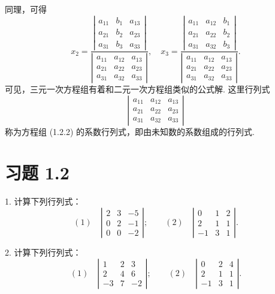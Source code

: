 \documentclass[UTF8, 12pt, fontset=fandol, oneside]{ctexart}
\begin{document}
同理，可得
\[
x_2=
\frac{
\left|\begin{array}{ccc}
a_{11} & b_1 & a_{13}\\
a_{21} & b_2 & a_{23}\\
a_{31} & b_3 & a_{33}
\end{array}\right|}
{\left|\begin{array}{ccc}
a_{11} & a_{12} & a_{13}\\
a_{21} & a_{22} & a_{23}\\
a_{31} & a_{32} & a_{33}
\end{array}\right|},\quad
x_3=
\frac{
\left|\begin{array}{ccc}
a_{11} & a_{12} & b_1\\
a_{21} & a_{22} & b_2\\
a_{31} & a_{32} & b_3
\end{array}\right|}
{\left|\begin{array}{ccc}
a_{11} & a_{12} & a_{13}\\
a_{21} & a_{22} & a_{23}\\
a_{31} & a_{32} & a_{33}
\end{array}\right|}.
\]
可见，三元一次方程组有着和二元一次方程组类似的公式解. 这里行列式
\[
\left|\begin{array}{ccc}
a_{11} & a_{12} & a_{13}\\
a_{21} & a_{22} & a_{23}\\
a_{31} & a_{32} & a_{33}
\end{array}\right|
\]
称为方程组 (1.2.2) 的系数行列式，即由未知数的系数组成的行列式.

\section*{习题 1.2}

1. 计算下列行列式：
\[
(1)\quad
\left|\begin{array}{ccc}
2 & 3 & -5\\
0 & 2 & -1\\
0 & 0 & -2
\end{array}\right|;\qquad
(2)\quad
\left|\begin{array}{ccc}
0 & 1 & 2\\
2 & 1 & 1\\
-1 & 3 & 1
\end{array}\right|.
\]

2. 计算下列行列式：
\[
(1)\quad
\left|\begin{array}{ccc}
1 & 2 & 3\\
2 & 4 & 6\\
-3 & 7 & -2
\end{array}\right|;\qquad
(2)\quad
\left|\begin{array}{ccc}
0 & 2 & 4\\
2 & 1 & 1\\
-1 & 3 & 1
\end{array}\right|.
\]
\end{document}

